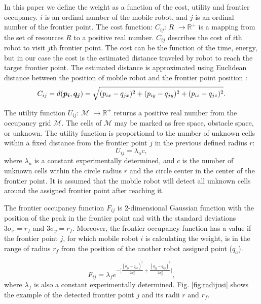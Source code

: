 \documentclass[letterpaper, 10 pt, conference]{ieeeconf}  %
\begin{document}
In this paper we define the weight as a function of the cost, utility and frontier occupancy.  $i$ is an ordinal number of the mobile robot, and $j$ is an ordinal number of the frontier point. The cost function: $C_{ij}$: $R$ \(\rightarrow \text{$\mathbb{R}^{+}$}\) is a mapping from the set of resources $R$ to a positive real number. $C_{ij}$ describes the cost of $i$th robot to visit $j$th frontier point. The cost can be the function of the time, energy, but in our case the cost is the estimated distance traveled by robot to reach the target frontier point. The estimated distance is approximated using Euclidean distance between the position of mobile robot  and the frontier point position :
\begin{equation}\small
    C_{ij}=d(\boldsymbol{p_{i}}, \boldsymbol{q_{j}}) = \sqrt{(p_{ix}-q_{jx})^{2}+(p_{iy}-q_{jy})^{2}+(p_{iz}-q_{jz})^{2}}.
    \label{cost}
\end{equation}

The utility function $U_{ij}$:  \(\text{$\mathcal {M}$}\) \(\rightarrow \text{$\mathbb{R}^{+}$}\) returns a positive real number from the occupancy grid \(\text{$\mathcal {M}$}\). The cells of \(\text{$\mathcal {M}$}\) may be marked as free space, obstacle space, or unknown. The utility function is proportional to the number of unknown cells within a fixed distance from the frontier point $j$ in the previous defined radius $r$: 
\begin{equation}
    U_{ij} = \lambda_{u}c,
\end{equation}
where $\lambda_{u}$ is a constant experimentally determined, and  $c$ is the number of unknown cells within the circle radius $r$ and the circle center in the center of the frontier point. It is assumed that the mobile robot will detect all unknown cells around the assigned frontier point after reaching it. 

The frontier occupancy function $F_{ij}$ is 2-dimensional Gaussian function with the position of the peak in the frontier point and with the standard deviations $3\sigma_{x}=r_{f}$ and $3\sigma_{y}=r_{f}$. Moreover, the frontier occupancy function has a value if the frontier point $j$, for which mobile robot $i$ is calculating the weight, is in the range of radius $r_{f}$ from the position of the another robot assigned point ($q_{a}$). 

\begin{equation}
    F_{ij} =  \lambda_{f} e^{-\Big[\frac{(q_{jx} - q_{ax})^2}{2\sigma_{x}^2} + \frac{(q_{jy} - q_{ay})^2}{2\sigma_{y}^2}\Big]},
\end{equation}
where $\lambda_{f}$  is also  a constant experimentally determined. Fig. \ref{fig:radijusi} shows the example of the detected frontier point $j$ and its radii $r$ and $r_{f}$.
\end{document}
